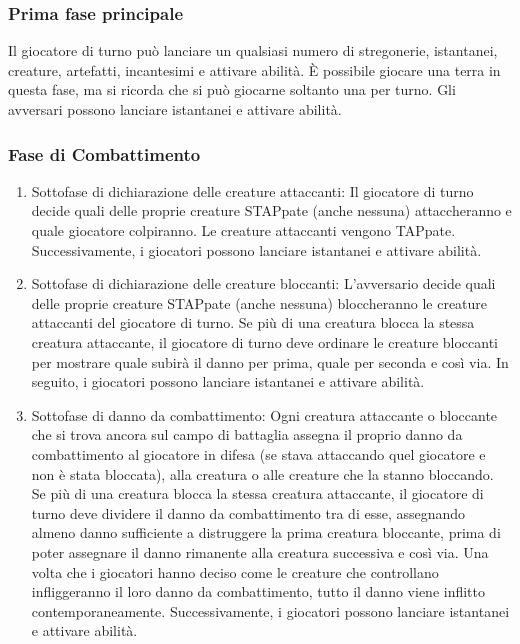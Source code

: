 \subsubsection{Prima fase principale} Il giocatore di turno può lanciare un qualsiasi numero di stregonerie, istantanei, creature, artefatti, incantesimi e attivare abilità. È possibile giocare una terra in questa fase, ma si ricorda che si può giocarne soltanto una per turno. Gli avversari possono lanciare istantanei e attivare abilità.


\subsubsection{Fase di Combattimento}
\begin{enumerate}[label=\alph*.]
    
    \item Sottofase di dichiarazione delle creature attaccanti: Il giocatore di turno decide quali delle proprie creature STAPpate (anche nessuna) attaccheranno e quale giocatore colpiranno. Le creature attaccanti vengono TAPpate. Successivamente, i giocatori possono lanciare istantanei e attivare abilità.
    
    \item Sottofase di dichiarazione delle creature bloccanti: L'avversario decide quali delle proprie creature STAPpate (anche nessuna) bloccheranno le creature attaccanti del giocatore di turno. Se più di una creatura blocca la stessa creatura attaccante, il giocatore di turno deve ordinare le creature bloccanti per mostrare quale subirà il danno per prima, quale per seconda e così via. In seguito, i giocatori possono lanciare istantanei e attivare abilità.
    
    \item Sottofase di danno da combattimento: Ogni creatura attaccante o bloccante che si trova ancora sul campo di battaglia assegna il proprio danno da combattimento al giocatore in difesa (se stava attaccando quel giocatore e non è stata bloccata), alla creatura o alle creature che la stanno bloccando. Se più di una creatura blocca la stessa creatura attaccante, il giocatore di turno deve dividere il danno da combattimento tra di esse, assegnando almeno danno sufficiente a distruggere la prima creatura bloccante, prima di poter assegnare il danno rimanente alla creatura successiva e così via. Una volta che i giocatori hanno deciso come le creature che controllano infliggeranno il loro danno da combattimento, tutto il danno viene inflitto contemporaneamente. Successivamente, i giocatori possono lanciare istantanei e attivare abilità.
    
\end{enumerate}

